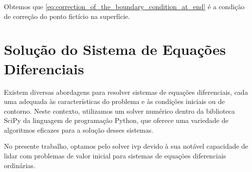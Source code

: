 Obtemos que \ref{eq:correction_of_the_boundary_condition_at_end} é a condição de correção do ponto fictício na superfície.

\section{Solução do Sistema de Equações Diferenciais}

Existem diversas abordagens para resolver sistemas de equações diferenciais, cada uma adequada às características do problema e às condições iniciais ou de contorno. Neste contexto, utilizamos um solver numérico dentro da biblioteca SciPy da linguagem de programação Python, que oferece uma variedade de algoritmos eficazes para a solução desses sistemas.

No presente trabalho, optamos pelo solver ivp devido à sua notável capacidade de lidar com problemas de valor inicial para sistemas de equações diferenciais ordinárias.

